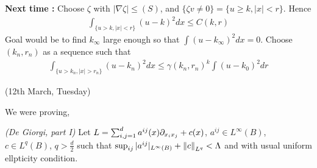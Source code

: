 \documentclass[12pt,a4paper]{article}
\newenvironment{proof}
{\begin{changemargin}{0.5cm}{0.5cm} 
	}%
	{\end{changemargin}
}
\newenvironment{p}
{\begin{proof} 
	}%
	{\end{proof}
}
\begin{document}
\begin{p}
\textbf{Next time :} Choose $\zeta$ with $|\nabla \zeta| \leq (S)$, and $\{\zeta v\neq 0\} = \{u\geq k, |x| < r\}$. Hence
\begin{align*}
\int_{\{u >k, |x|<r \}} (u-k)^2 dx \leq C(k, r)
\end{align*}
Goal would be to find $k_{\infty}$ large enough so that $\int (u-k_{\infty})^2 dx =0$. Choose $(k_n, r_n)$ as a sequence such that
\begin{align*}
\int_{\{u > k_n, |x|> r_n \}} (u - k_n)^2 dx \leq \gamma(k_n, r_n)^k \int (u-k_0)^2 dr 
\end{align*}
\end{p}
\s

\newday

(12th March, Tuesday)
\s

We were proving,
\s

\thm \emph{(De Giorgi, part I)} Let $L = \sum_{i,j=1}^d a^{ij}(x) \partial_{x_i x_j} + c(x)$, $a^{ij} \in L^{\infty}(B)$, $c\in L^q(B)$, $q> \frac{d}{2}$ such that $\sup_{ij} |a^{ij}|_{L^{\infty}(B)} + \snorms{c}{L^q} < \Lambda$ and with usual uniform ellpticity condition.
\end{document}
